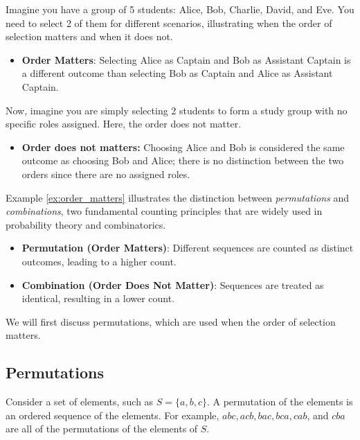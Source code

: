 \begin{example}
    Imagine you have a group of 5 students: Alice, Bob, Charlie, David, and Eve. You need to select 2 of them for different scenarios, illustrating when the order of selection matters and when it does not.
    \begin{itemize}
        \item \textbf{Order Matters}: Selecting Alice as Captain and Bob as Assistant Captain is a different outcome than selecting Bob as Captain and Alice as Assistant Captain.
        \end{itemize}
    Now, imagine you are simply selecting 2 students to form a study group with no specific roles assigned. Here, the order does not matter.
    \begin{itemize}
        \item \textbf{Order does not matters:}  Choosing Alice and Bob is considered the same outcome as choosing Bob and Alice; there is no distinction between the two orders since there are no assigned roles.
    \end{itemize}
    \label{ex:order_matters}
\end{example}

Example \ref{ex:order_matters} illustrates the distinction between \textit{permutations} and \textit{combinations}, two fundamental counting principles that are widely used in probability theory and combinatorics.

\begin{definition}
    \begin{itemize}
        \item \textbf{Permutation (Order Matters)}: Different sequences are counted as distinct outcomes, leading to a higher count.
        \item \textbf{Combination (Order Does Not Matter)}: Sequences are treated as identical, resulting in a lower count.
    \end{itemize}
\end{definition}

We will first discuss permutations, which are used when the order of selection matters.

\subsection*{Permutations}

Consider a set of elements, such as $S=\{a, b, c\}$. A permutation of the elements is an ordered sequence of the elements. For example, $a b c, a c b, b a c, b c a, c a b$, and $c b a$ are all of the permutations of the elements of $S$.

